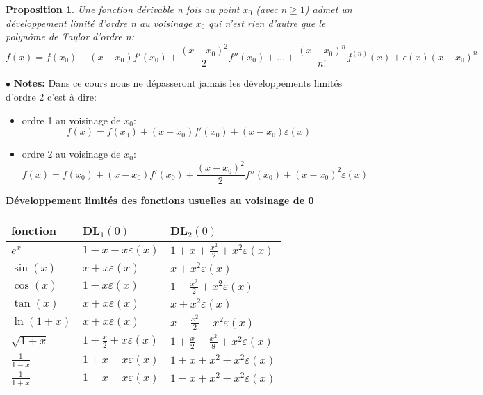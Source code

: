 \documentclass[a4paper]{article}
\theoremstyle{break}
\newtheorem{prop}{Proposition}[section]
\newcommand{\note}{$\bullet$ \textbf{Notes: }}
\begin{document}
\begin{prop}
  Une fonction dérivable n fois au point $x_0$ (avec $n \geq 1$) admet
  un développement limité d'ordre n au voisinage $x_0$ qui n'est rien
  d'autre que le polynôme de Taylor d'ordre n:
  \[
    f(x) = f(x_0) + (x-x_0)f'(x_0) + \frac{(x-x_0)^2}{2} f''(x_0) +
    \dots + \frac{(x-x_0)^n}{n!} f^{(n)}(x) + \epsilon(x)(x-x_0)^n
  \]
\end{prop}

\note Dans ce cours nous ne dépasseront jamais les développements
limités d'ordre 2 c'est à dire:
\begin{itemize}[label=$\bullet$, leftmargin=2cm]
\item ordre 1 au voisinage de $x_0$:
  \[
    f(x) = f(x_0) + (x-x_0)f'(x_0) + (x-x_0) \varepsilon(x)
  \]
\item ordre 2 au voisinage de $x_0$:
  \[
    f(x) = f(x_0) + (x-x_0)f'(x_0) + \frac{(x-x_0)^2}{2} f''(x_0)
    + (x-x_0)^2 \varepsilon(x)
  \]
\end{itemize}

\textbf{Développement limités des fonctions usuelles au voisinage de
  0}
\begin{center}
  \renewcommand{\arraystretch}{1.5} %
  \begin{tabular}{|l|C{5cm}|C{5cm}|}
    \hline
    fonction & DL$_1(0)$ & DL$_2(0)$\\
    \hline
    $e^x$ & $1 + x + x \varepsilon(x)$
          & $1 + x + \frac{x^2}{2} + x^2 \varepsilon(x)$ \\
    \hline
    $\sin(x)$ & $x + x \varepsilon(x)$
              & $x + x^2 \varepsilon(x)$ \\
    \hline
    $\cos(x)$ & $1 + x\varepsilon(x)$
              & $1 - \frac{x^2}{2} + x^2 \varepsilon(x)$ \\
    \hline
    $\tan(x)$ & $x + x \varepsilon(x)$
              & $x + x^2 \varepsilon(x)$ \\
    \hline
    $\ln(1+x)$ & $x + x \varepsilon(x)$
               & $x - \frac{x^2}{2} + x^2 \varepsilon(x)$ \\
    \hline
    $\sqrt{1+x}$ & $1 + \frac{x}{2} + x \varepsilon(x)$
                 & $1 + \frac{x}{2} - \frac{x^2}{8}+ x^2
                   \varepsilon(x)$ \\
    \hline
    $\frac{1}{1-x}$ & $1 + x + x \varepsilon(x)$
                    & $1 + x + x^2 + x^2 \varepsilon(x)$  \\
    \hline
    $\frac{1}{1+x}$ & $1 - x + x \varepsilon(x)$
                    & $1 - x + x^2 + x^2 \varepsilon(x)$\\
    \hline
  \end{tabular}
\end{center}
\end{document}
